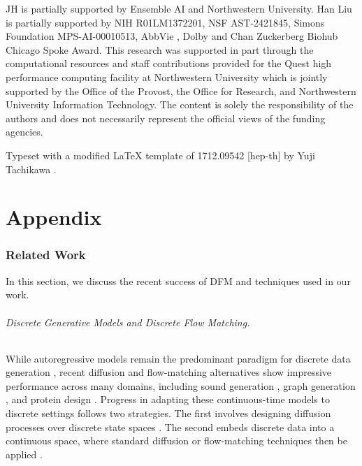 \documentclass[12pt]{article}
\numberwithin{equation}{section}
\let\cite\citep
\theoremstyle{theoremstyle}
\numberwithin{equation}{section}
\numberwithin{theorem}{section}
\numberwithin{proposition}{section}
\numberwithin{definition}{section}
\numberwithin{lemma}{section}
\numberwithin{assumption}{section}
\numberwithin{remark}{section}
\begin{document}
JH is partially supported by Ensemble AI and Northwestern University.
Han Liu is partially supported by NIH R01LM1372201, NSF
AST-2421845, Simons Foundation
MPS-AI-00010513, AbbVie , Dolby and Chan Zuckerberg Biohub Chicago Spoke Award.
This research was supported in part through the computational resources and staff contributions provided for the Quest high performance computing facility at Northwestern University which is jointly supported by the Office of the Provost, the Office for Research, and Northwestern University Information Technology.
The content is solely the responsibility of the authors and does not necessarily represent the official
views of the funding agencies.

Typeset with a modified LaTeX template of 1712.09542 [hep-th] by Yuji Tachikawa \cite{tachikawa2020gauging}.

\newpage
\appendix
\label{sec:append}
\part*{Appendix}
{
\setlength{\parskip}{-0em}
\startcontents[sections]
}

{
\setlength{\parskip}{-0em}
\startcontents[sections]
}
\clearpage




\section{Related Work}
\label{sec:related_work}
In this section, we discuss the recent success of DFM and techniques used in our work.


\paragraph{Discrete Generative Models and Discrete Flow Matching.}
While autoregressive models remain the predominant paradigm for discrete data generation \cite{achiam2023gpt,liu2024deepseek,ingraham2019generative}, recent diffusion and flow-matching alternatives show impressive performance across many domains, including sound generation \cite{yang2023diffsound}, graph generation \cite{vignac2022digress}, and protein design \cite{campbell2024generative}.
Progress in adapting these continuous-time models to discrete settings follows two strategies. 
The first involves designing diffusion processes over discrete state spaces \cite{sohl2015deep,hoogeboom2021argmax,austin2021structured,lou2023discrete,yang2023diffsound,vignac2022digress}. 
The second embeds discrete data into a continuous space, where standard diffusion or flow-matching techniques then be applied \cite{dieleman2022continuous,campbell2022continuous,davis2024fisher}.
\end{document}
